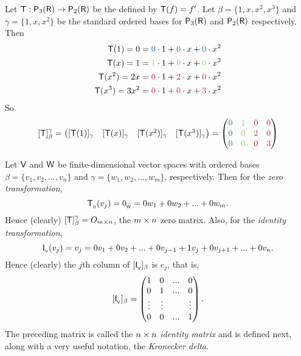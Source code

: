 \begin{example} \label{example 2.2.4}
Let \(\textsf{T} : \textsf{P}_3(\textsf{R}) \to \textsf{P}_2(\textsf{R})\) be the \LTRAN{} defined by \(\textsf{T}(f) = f'\).
Let \(\beta = \{ 1, x, x^2, x^3 \}\) and \(\gamma = \{ 1, x, x^2 \}\) be the standard ordered bases for \(\textsf{P}_3(\textsf{R})\) and \(\textsf{P}_2(\textsf{R})\)
respectively.
Then
\begin{align*}
         \T(1) = 0 & = \BLUE{0} \cdot 1 + \BLUE{0} \cdot x + \BLUE{0} \cdot x^2 \\
         \T(x) = 1 & = \GREEN{1} \cdot 1 + \GREEN{0} \cdot x + \GREEN{0} \cdot x^2 \\
      \T(x^2) = 2x & = \MAROON{0} \cdot 1 + \MAROON{2} \cdot x + \MAROON{0} \cdot x^2 \\
    \T(x^3) = 3x^2 & = \RED{0} \cdot 1 + \RED{0} \cdot x + \RED{3} \cdot x^2
\end{align*}
So
\[
    [\T]_{\beta}^{\gamma}
    = \begin{pmatrix}
     [\T(1)]_{\gamma} & [\T(x)]_{\gamma} & [\T(x^2)]_{\gamma} & [\T(x^3)]_{\gamma}
    \end{pmatrix}
    = \begin{pmatrix}
        \BLUE{0} & \GREEN{1} & \MAROON{0} & \RED{0} \\
        \BLUE{0} & \GREEN{0} & \MAROON{2} & \RED{0} \\
        \BLUE{0} & \GREEN{0} & \MAROON{0} & \RED{3}
    \end{pmatrix}
\]
\end{example}

\begin{additional definition} \label{adef}
Let \(\textsf{V}\) and \(\textsf{W}\) be finite-dimensional vector spaces with ordered bases \(\beta = \{ v_1, v_2, ..., v_n \}\) and \(\gamma = \{ w_1, w_2, ..., w_m \}\), respectively.
Then for the \emph{zero transformation},
\[
    \textsf{T}_{_0}(v_j) = 0_{_{\textsf{W}}} = 0 w_1 + 0 w_2 + ... + 0 w_m.
\]
Hence (clearly) \([\textsf{T}]_{\beta}^{\gamma} = O_{m \times n}\), the \(m \times n\) zero matrix.
Also, for the \emph{identity transformation},
\[
\textsf{I}_{_{\textsf{V}}}(v_j) = v_j = 0v_1 + 0v_2 + ... + 0v_{j - 1} + 1 v_j + 0 v_{j + 1} + ... + 0v_n.
\]
Hence (clearly) the \(j\)th column of \([\textsf{I}_{_{\textsf{V}}}]_{\beta}\) is \(e_j\), that is,
\[
    [\textsf{I}_{_{\textsf{V}}}]_{\beta} = \begin{pmatrix}
        1 & 0 & ... & 0 \\
        0 & 1 & ... & 0 \\
        \vdots & \vdots & & \vdots \\
        0 & 0 & ... & 1
    \end{pmatrix}.
\]
The preceding matrix is called the \(n \times n\) \emph{identity matrix} and is defined next, along with a very useful notation, the \emph{Kronecker delta}.
\end{additional definition}

